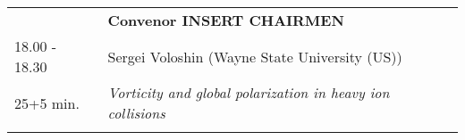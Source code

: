 \begin{longtable}{p{3cm}p{13cm}}
&\hfill {\bf Convenor INSERT CHAIRMEN }\\ 
18.00 - 18.30 & Sergei Voloshin (Wayne State University (US))\\ 
25+5 min. & {\it Vorticity and global polarization in heavy ion collisions}\\ 
 & \\ 
\end{longtable}

